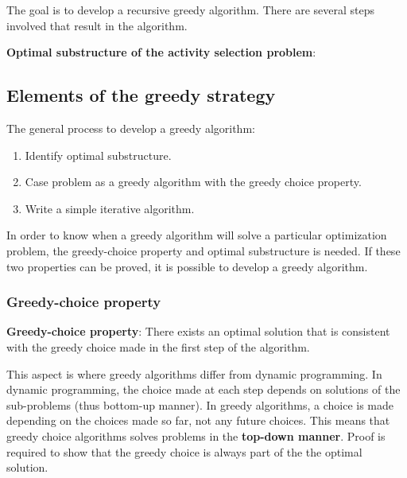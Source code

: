 \documentclass[10pt,a4paper]{article}
\begin{document}
The goal is to develop a recursive greedy algorithm. There are several steps involved that result
in the algorithm. \par 

\textbf{Optimal substructure of the activity selection problem}:








\subsection{Elements of the greedy strategy}

The general process to develop a greedy algorithm:
\begin{enumerate}
    \item Identify optimal substructure.
    \item Case problem as a greedy algorithm with the greedy choice property.
    \item Write a simple iterative algorithm.
\end{enumerate}

In order to know when a greedy algorithm will solve a particular optimization problem, the
greedy-choice property and optimal substructure is needed. If these two properties can be proved, it
is possible to develop a greedy algorithm.

\pagebreak

\subsubsection{Greedy-choice property}

\begin{tcolorbox}[breakable,colback=white]
\textbf{Greedy-choice property}: There exists an optimal solution that is consistent with the greedy
choice made in the first step of the algorithm.
\end{tcolorbox}

This aspect is where greedy algorithms differ from dynamic programming. In dynamic programming, the
choice made at each step depends on solutions of the sub-problems (thus bottom-up manner). In greedy
algorithms, a choice is made depending on the choices made so far, not any future choices. This
means that greedy choice algorithms solves problems in the \textbf{top-down manner}. Proof is
required to show that the greedy choice is always part of the the optimal solution.
\end{document}
